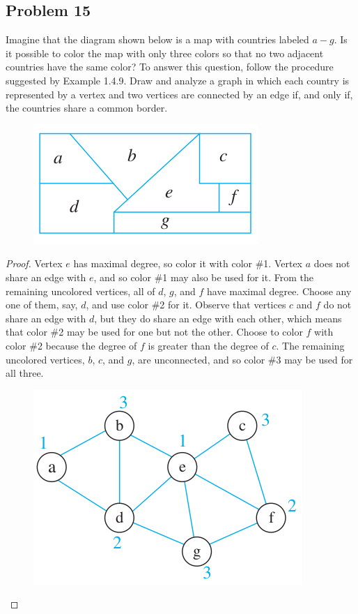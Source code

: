 \documentclass[14pt]{extarticle}
\begin{document}
\subsection{Problem 15}
Imagine that the diagram shown below is a map with countries labeled $a-g$.
Is it possible to color the map with only three colors so that no two adjacent
countries have the same color? To answer this question, follow the procedure
suggested by Example 1.4.9. Draw and analyze a graph in which each country is
represented by a vertex and two vertices are connected by an edge if, and only
if, the countries share a common border.

\begin{figure}[ht!]
\centering
\includegraphics[scale=0.5]{../images/1.4.15.png}
\end{figure}

\begin{proof}
Vertex $e$ has maximal degree, so color it with color \#1. Vertex $a$ does not
share an edge with $e$, and so color \#1 may also be used for it. From the
remaining uncolored vertices, all of $d$, $g$, and $f$ have maximal degree.
Choose any one of them, say, $d$, and use color \#2 for it. Observe that
vertices $c$ and $f$ do not share an edge with $d$, but they do share an edge
with each other, which means that color \#2 may be used for one but not the
other. Choose to color $f$ with color \#2 because the degree of $f$ is greater
than the degree of $c$. The remaining uncolored vertices, $b$, $c$, and $g$,
are unconnected, and so color \#3 may be used for all three.

\begin{figure}[ht!]
\centering
\includegraphics[scale=0.5]{../images/1.4.15.sol.png}
\end{figure}
\end{proof}
\end{document}
